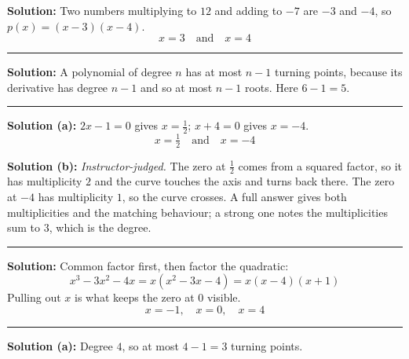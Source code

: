 \documentclass[12pt]{article}
\begin{document}



\textbf{Solution:} Two numbers multiplying to $12$ and adding to $-7$ are $-3$ and $-4$, so $p(x) = (x-3)(x-4)$.
\[ \boxed{x = 3 \quad \text{and} \quad x = 4} \]

\vspace{0.1cm}\noindent\rule{\linewidth}{0.2pt}


\textbf{Solution:} A polynomial of degree $n$ has at most $n - 1$ turning points, because its derivative has degree $n - 1$ and so at most $n - 1$ roots. Here $6 - 1 = 5$. 

\vspace{0.1cm}\noindent\rule{\linewidth}{0.2pt}


\textbf{Solution (a):} $2x - 1 = 0$ gives $x = \tfrac{1}{2}$; $x + 4 = 0$ gives $x = -4$.
\[ \boxed{x = \tfrac{1}{2} \quad \text{and} \quad x = -4} \]

\textbf{Solution (b):} \emph{Instructor-judged.} The zero at $\tfrac{1}{2}$ comes from a squared factor, so it has multiplicity $2$ and the curve touches the axis and turns back there. The zero at $-4$ has multiplicity $1$, so the curve crosses. A full answer gives both multiplicities and the matching behaviour; a strong one notes the multiplicities sum to $3$, which is the degree.

\vspace{0.1cm}\noindent\rule{\linewidth}{0.2pt}


\textbf{Solution:} Common factor first, then factor the quadratic:
\[ x^{3} - 3x^{2} - 4x = x\left(x^{2} - 3x - 4\right) = x(x-4)(x+1) \]
Pulling out $x$ is what keeps the zero at $0$ visible.
\[ \boxed{x = -1, \quad x = 0, \quad x = 4} \]

\vspace{0.1cm}\noindent\rule{\linewidth}{0.2pt}


\textbf{Solution (a):} Degree $4$, so at most $4 - 1 = 3$ turning points. 
\end{document}
